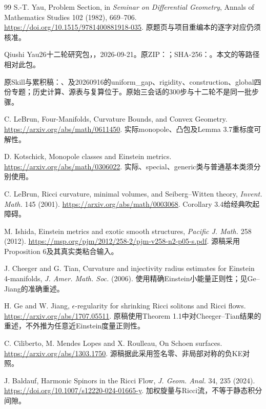 \documentclass[UTF8,fontset=fandol,zihao=-4]{ctexart}
\theoremstyle{research}
\begin{document}
\begin{thebibliography}{99}
 S.-T. Yau, Problem Section, in \emph{Seminar on Differential Geometry}, Annals of Mathematics Studies 102 (1982), 669--706. \url{https://doi.org/10.1515/9781400881918-035}. 原题页与项目重编本的逐字对应仍须核准。

 Qiushi Yau26十二轮研究包，，2026-09-21。原ZIP：；SHA-256：。本文的等路径相对此包。

 原Skill与累积稿：、及20260916的uniform\_gap、rigidity、construction、global四份专题；历史计算、源表与复算位于。原始三会话的300步与十二轮不是同一批步骤。

 C. LeBrun, Four-Manifolds, Curvature Bounds, and Convex Geometry. \url{https://arxiv.org/abs/math/0611450}. 实际monopole、凸包及Lemma 3.7重标度可解性。

 D. Kotschick, Monopole classes and Einstein metrics. \url{https://arxiv.org/abs/math/0306022}. 实际、special、generic类与普通基本类须分别使用。

 C. LeBrun, Ricci curvature, minimal volumes, and Seiberg--Witten theory, \emph{Invent. Math.} 145 (2001). \url{https://arxiv.org/abs/math/0003068}. Corollary 3.4给经典吹起障碍。

 M. Ishida, Einstein metrics and exotic smooth structures, \emph{Pacific J. Math.} 258 (2012). \url{https://msp.org/pjm/2012/258-2/pjm-v258-n2-p05-s.pdf}. 源稿采用Proposition 6及其真实类粘合输入。

 J. Cheeger and G. Tian, Curvature and injectivity radius estimates for Einstein 4-manifolds, \emph{J. Amer. Math. Soc.} (2006). 使用精确Einstein小能量正则性；见Ge--Jiang的准确重述。

 H. Ge and W. Jiang, $\epsilon$-regularity for shrinking Ricci solitons and Ricci flows. \url{https://arxiv.org/abs/1707.05511}. 原稿使用Theorem 1.1中对Cheeger--Tian结果的重述，不外推为任意近Einstein度量正则性。

 C. Ciliberto, M. Mendes Lopes and X. Roulleau, On Schoen surfaces. \url{https://arxiv.org/abs/1303.1750}. 源稿据此采用签名零、非局部对称的负KE对照。

 J. Baldauf, Harmonic Spinors in the Ricci Flow, \emph{J. Geom. Anal.} 34, 235 (2024). \url{https://doi.org/10.1007/s12220-024-01665-y}. 加权旋量与Ricci流，不等于静态积分间隙。


\end{thebibliography}
\end{document}
